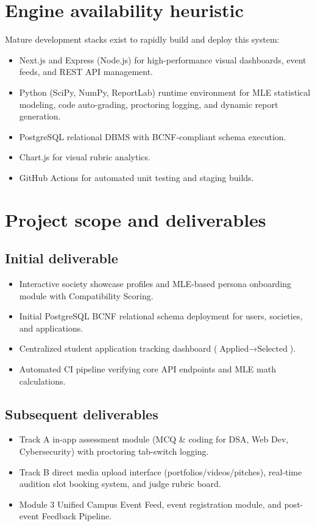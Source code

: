 \documentclass[11pt,a4paper]{article}
\begin{document}
\section{Engine availability heuristic}
Mature development stacks exist to rapidly build and deploy this system:
\begin{itemize}[leftmargin=0.7cm]
    \item Next.js and Express (Node.js) for high-performance visual dashboards, event feeds, and REST API management.
    \item Python (SciPy, NumPy, ReportLab) runtime environment for MLE statistical modeling, code auto-grading, proctoring logging, and dynamic report generation.
    \item PostgreSQL relational DBMS with BCNF-compliant schema execution.
    \item Chart.js for visual rubric analytics.
    \item GitHub Actions for automated unit testing and staging builds.
\end{itemize}

\section{Project scope and deliverables}
\subsection{Initial deliverable}
\begin{itemize}[leftmargin=0.7cm]
    \item Interactive society showcase profiles and MLE-based persona onboarding module with Compatibility Scoring.
    \item Initial PostgreSQL BCNF relational schema deployment for users, societies, and applications.
    \item Centralized student application tracking dashboard ($\text{Applied} \rightarrow \text{Selected}$).
    \item Automated CI pipeline verifying core API endpoints and MLE math calculations.
\end{itemize}

\subsection{Subsequent deliverables}
\begin{itemize}[leftmargin=0.7cm]
    \item Track A in-app assessment module (MCQ \& coding for DSA, Web Dev, Cybersecurity) with proctoring tab-switch logging.
    \item Track B direct media upload interface (portfolios/videos/pitches), real-time audition slot booking system, and judge rubric board.
    \item Module 3 Unified Campus Event Feed, event registration module, and post-event Feedback Pipeline.
\end{itemize}
\end{document}

